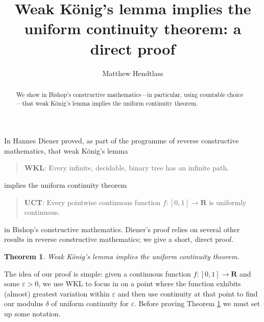 \documentclass[11pt]{amsart}
\newtheorem{theorem}[lemma]{Theorem}
\begin{document}
\title{Weak K\"{o}nig's lemma implies the uniform continuity theorem: a direct proof}
\author[Hendtlass]{Matthew Hendtlass}
 \address{School of Mathematics and Statistics,
    University of Canterbury,
    Christchurch 8041,
    New Zealand}

\begin{abstract}
\noindent
We show in Bishop's constructive mathematics---in particular, using countable choice---that weak K\"{o}nig's lemma implies the uniform continuity theorem.
\end{abstract}

\maketitle


\bigskip
\noindent
In \cite{HD} Hannes Diener proved, as part of the programme of reverse constructive mathematics, that weak K\"{o}nig's lemma
\begin{quote}
 \textbf{WKL}: Every infinite, decidable, binary tree has an infinite path. 
\end{quote} 
implies the uniform continuity theorem
\begin{quote}
 \textbf{UCT}: Every pointwise continuous function $f:[0, 1]\rightarrow\mathbf{R}$ is uniformly continuous. 
\end{quote} 
in Bishop's constructive mathematics. Diener's proof relies on several other results in reverse constructive mathematics; we give a short, direct proof.

\begin{theorem}
\label{T}
Weak K\"{o}nig's lemma implies the uniform continuity theorem.
\end{theorem}

\noindent
The idea of our proof is simple: given a continuous function $f:[0,1]\rightarrow\mathbf{R}$ and some $\varepsilon>0$, we use WKL to focus in on a point where the function exhibits (almost) greatest variation within $\varepsilon$ and then use continuity at that point to find our modulus $\delta$ of uniform continuity for $\varepsilon$. Before proving Theorem \ref{T} we must set up some notation.
\end{document}
